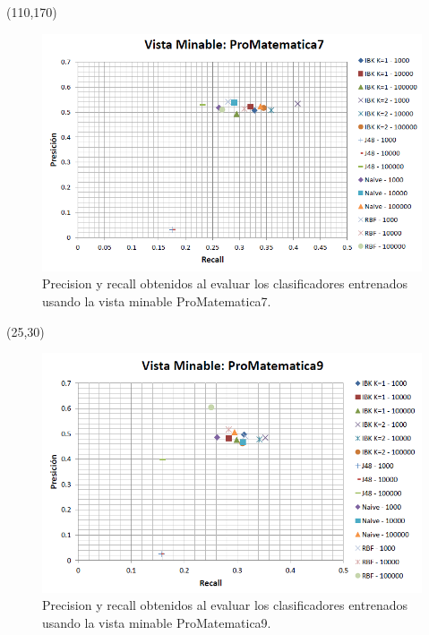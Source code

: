 \documentclass{article}
\begin{document}
\begin{textblock}{80}(110,170)
\begin{figure}[!htb]
\begin{centering}
\includegraphics[scale=0.4]{promatematica7}
\par\end{centering}
\caption{Precision y recall obtenidos al evaluar los clasificadores entrenados usando la vista minable ProMatematica7.}
\label{fig:figura16}
\end{figure}
\end{textblock}
\null
\newpage
\begin{textblock}{80}(25,30)
\begin{figure}[!htb]
\begin{centering}
\includegraphics[scale=0.4]{promatematica9}
\par\end{centering}
\caption{Precision y recall obtenidos al evaluar los clasificadores entrenados usando la vista minable ProMatematica9.}
\label{fig:figura17}
\end{figure}
\end{textblock}
\end{document}
